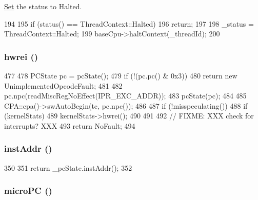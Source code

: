\hyperlink{classSet}{Set} the status to Halted. 


\begin{DoxyCode}
194 {
195     if (status() == ThreadContext::Halted)
196         return;
197 
198     _status = ThreadContext::Halted;
199     baseCpu->haltContext(_threadId);
200 }
\end{DoxyCode}
\hypertarget{classSimpleThread_a5f42e07ae335dff417664e91518c7f1e}{
\subsubsection[{hwrei}]{ hwrei ()}}
\label{classSimpleThread_a5f42e07ae335dff417664e91518c7f1e}



\begin{DoxyCode}
477 {
478     PCState pc = pcState();
479     if (!(pc.pc() & 0x3))
480         return new UnimplementedOpcodeFault;
481 
482     pc.npc(readMiscRegNoEffect(IPR_EXC_ADDR));
483     pcState(pc);
484 
485     CPA::cpa()->swAutoBegin(tc, pc.npc());
486 
487     if (!misspeculating()) {
488         if (kernelStats)
489             kernelStats->hwrei();
490     }
491 
492     // FIXME: XXX check for interrupts? XXX
493     return NoFault;
494 }
\end{DoxyCode}
\hypertarget{classSimpleThread_a53c92716db281ae16ffb693c6d7803c7}{
\subsubsection[{instAddr}]{ instAddr ()}}
\label{classSimpleThread_a53c92716db281ae16ffb693c6d7803c7}



\begin{DoxyCode}
350     {
351         return _pcState.instAddr();
352     }
\end{DoxyCode}
\hypertarget{classSimpleThread_a1a21696f33a7d38f251687ae0b5e9718}{
\subsubsection[{microPC}]{ microPC ()}}
\label{classSimpleThread_a1a21696f33a7d38f251687ae0b5e9718}



